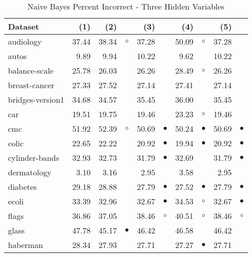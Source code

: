 \newpage
{\centering \footnotesize \begin{longtable}{lrr@{\hspace{0.1cm}}cr@{\hspace{0.1cm}}cr@{\hspace{0.1cm}}cr@{\hspace{0.1cm}}c}
\caption{\label{nbpi3}Naive Bayes Percent Incorrect - Three Hidden Variables}
\\
\hline
Dataset & (1)& (2) & & (3) & & (4) & & (5) & \\
\hline
audiology & 37.44 & 38.34 &   $\circ$ & 37.28 &           & 50.09 &    $\circ$ & 37.28 &          \\
autos &  9.89 &  9.94 &           & 10.22 &           &  9.62 &            & 10.22 &          \\
balance-scale & 25.78 & 26.03 &           & 26.26 &           & 28.49 &    $\circ$ & 26.26 &          \\
breast-cancer & 27.33 & 27.52 &           & 27.14 &           & 27.41 &            & 27.14 &          \\
bridges-version1 & 34.68 & 34.57 &           & 35.45 &           & 36.00 &            & 35.45 &          \\
car & 19.51 & 19.75 &           & 19.46 &           & 23.23 &    $\circ$ & 19.46 &          \\
cmc & 51.92 & 52.39 &   $\circ$ & 50.69 & $\bullet$ & 50.24 &  $\bullet$ & 50.69 & $\bullet$\\
colic & 22.65 & 22.22 &           & 20.92 & $\bullet$ & 19.94 &  $\bullet$ & 20.92 & $\bullet$\\
cylinder-bands & 32.93 & 32.73 &           & 31.79 & $\bullet$ & 32.69 &            & 31.79 & $\bullet$\\
dermatology &  3.10 &  3.16 &           &  2.95 &           &  3.58 &            &  2.95 &          \\
diabetes & 29.18 & 28.88 &           & 27.79 & $\bullet$ & 27.52 &  $\bullet$ & 27.79 & $\bullet$\\
ecoli & 33.39 & 32.96 &           & 32.67 & $\bullet$ & 34.53 &    $\circ$ & 32.67 & $\bullet$\\
flags & 36.86 & 37.05 &           & 38.46 &   $\circ$ & 40.51 &    $\circ$ & 38.46 &   $\circ$\\
glass & 47.78 & 45.17 & $\bullet$ & 46.42 &           & 46.58 &            & 46.42 &          \\
haberman & 28.34 & 27.93 &           & 27.71 &           & 27.27 &  $\bullet$ & 27.71 &          \\

\end{longtable}}
